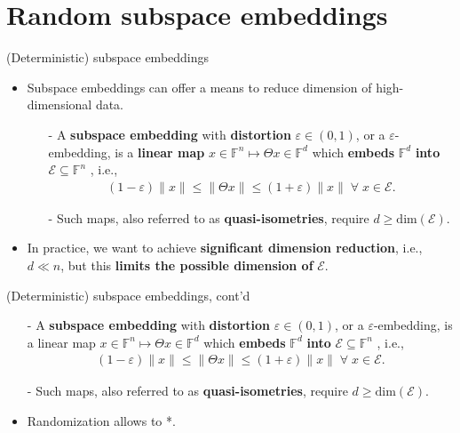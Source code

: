 \documentclass[t,usepdftitle=false]{beamer}
\begin{document}
\section{Random subspace embeddings}

\begin{frame}{(Deterministic) subspace embeddings}
\begin{itemize}
\item Subspace embeddings can offer a means to reduce dimension of high-dimensional data.
\begin{definition}
\begin{itemize}
\item[-] A \textbf{subspace embedding} with \textbf{distortion} $\varepsilon\in(0,1)$, or a $\varepsilon$-embedding, is a \textbf{linear map} $x\in\mathbb{F}^n\mapsto \Theta x\in\mathbb{F}^d$
which \textbf{embeds} $\mathbb{F}^d$ \textbf{into} $\mathcal{E}\subseteq\mathbb{F}^n$ , i.e.,
\begin{align*}
(1-\varepsilon)\|x\|\leq \|\Theta x\|\leq (1+\varepsilon)\|x\|
\;\forall\;x\in\mathcal{E}.
\end{align*}
\item[-] Such maps, also referred to as \textbf{quasi-isometries}, require $d\geq \mathrm{dim}(\mathcal{E})$.
\end{itemize}
\end{definition}
\item In practice, we want to achieve \textbf{significant dimension reduction}, i.e., $d\ll n$, but this \textbf{limits the possible dimension of} $\mathcal{E}$.
\end{itemize}
\end{frame}

\begin{frame}{(Deterministic) subspace embeddings, cont'd}
\begin{definition}
\begin{itemize}
\item[-] A \textbf{subspace embedding} with \textbf{distortion} $\varepsilon\in(0,1)$, or a $\varepsilon$-embedding, is a linear map $x\in\mathbb{F}^n\mapsto \Theta x\in\mathbb{F}^d$
which \textbf{embeds} $\mathbb{F}^d$ \textbf{into} $\mathcal{E}\subseteq\mathbb{F}^n$ , i.e.,
\begin{align*}
(1-\varepsilon)\|x\|\leq \|\Theta x\|\leq (1+\varepsilon)\|x\|
\;\forall\;x\in\mathcal{E}.
\end{align*}
\item[-] Such maps, also referred to as \textbf{quasi-isometries}, require $d\geq \mathrm{dim}(\mathcal{E})$.
\end{itemize}
\end{definition}
\begin{itemize}
\item Randomization allows to *.
\end{itemize}
\end{frame}
\end{document}
